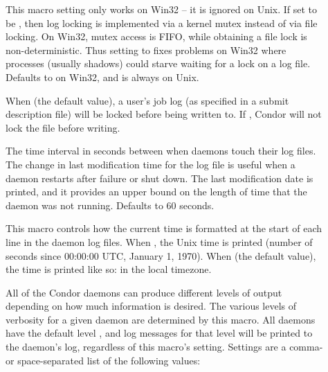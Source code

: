 \begin{description}
\item[] \label{param:FileLockViaMutex} 
  This macro setting only works on Win32 -- it is ignored on Unix.  If set
  to be , then log locking is implemented via a kernel mutex
  instead of via file locking.  On Win32, mutex access is FIFO, while
  obtaining a file lock is non-deterministic.  Thus setting to 
  fixes problems on Win32 where processes (usually shadows) could starve
  waiting for a lock on a log file.  Defaults to  on Win32, and is
  always  on Unix.

\item[] \label{param:EnableUserlogLocking}
  When  (the default value),
  a user's job log (as specified in a submit description file)
  will be locked before being written to.
  If , Condor will not lock the file before writing.

\item[] \label{param:TouchLogInterval}
  The time interval in seconds between when daemons touch
  their log files.  The change in last modification time for the
  log file is useful when a daemon restarts after failure or shut down.
  The last modification date is printed, and it provides an upper bound
  on the length of time that the daemon was not running.
  Defaults to 60 seconds.

\item[] \label{param:LogsUseTimestamp}
  This macro controls how the current time is formatted at the start of
  each line in the daemon log files. When , the Unix time is
  printed (number of seconds since 00:00:00 UTC, January 1, 1970).
  When  (the default value), the time is printed like so:
   in the local timezone.

\item[] \label{param:SubsysDebug}
  All of the
  Condor daemons can produce different levels of output depending on
  how much information is desired.  The various levels of
  verbosity for a given daemon are determined by this macro.  All
  daemons have the default level , and log messages for
  that level will be printed to the daemon's log, regardless of this
  macro's setting.  Settings are a comma- or space-separated list
  of the following values:


\end{description}

